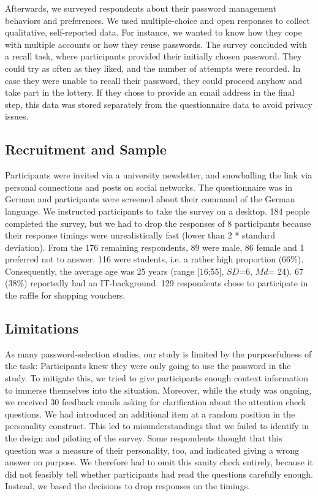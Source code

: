 Afterwards, we surveyed respondents about their password management behaviors and preferences. We used multiple-choice and open responses to collect qualitative, self-reported data. For instance, we wanted to know how they cope with multiple accounts or how they reuse passwords. The survey concluded with a recall task, where participants provided their initially chosen password. They could try as often as they liked, and the number of attempts were recorded. In case they were unable to recall their password, they could proceed anyhow and take part in the lottery. If they chose to provide an email address in the final step, this data was stored separately from the questionnaire data to avoid privacy issues. 

\subsection{Recruitment and Sample}
Participants were invited via a university newsletter, and snowballing the link via personal connections and posts on social networks. The questionnaire was in German and participants were screened about their command of the German language. We instructed participants to take the survey on a desktop. 
184 people completed the survey, but we had to drop the responses of 8 participants because their response timings were unrealistically fast (lower than 2 * standard deviation). From the 176 remaining respondents, 89 were male, 86 female and 1 preferred not to answer. 116 were students, i.e. a rather high proportion (66\%). Consequently, the average age was 25 years (range [16;55], $SD$=6, $Md$= 24). 67 (38\%) reportedly had an IT-background. 129 respondents chose to participate in the raffle for shopping vouchers. 

\subsection{Limitations}
As many password-selection studies, our study is limited by the purposefulness of the task: Participants knew they were only going to use the password in the study. To mitigate this, we tried to give participants enough context information to immerse themselves into the situation. Moreover, while the study was ongoing, we received 30 feedback emails asking for clarification about the attention check questions. We had introduced an additional item at a random position in the personality construct. This led to misunderstandings that we failed to identify in the design and piloting of the survey. Some respondents thought that this question was a measure of their personality, too, and indicated giving a wrong answer on purpose. We therefore had to omit this sanity check entirely, because it did not feasibly tell whether participants had read the questions carefully enough. Instead, we based the decisions to drop responses on the timings. 

